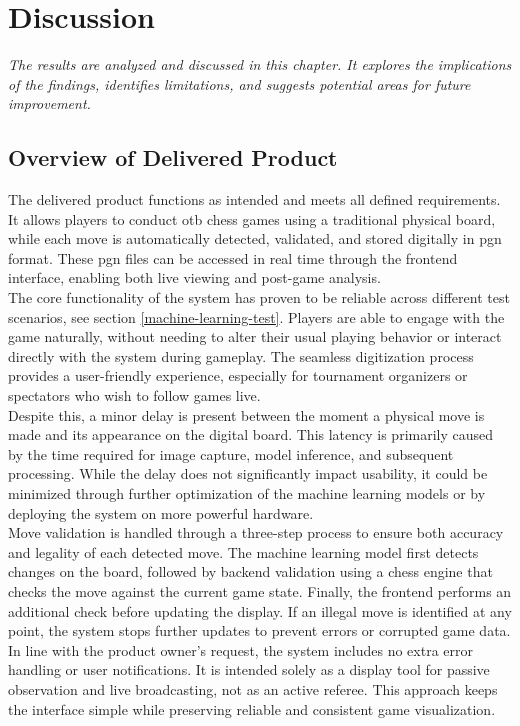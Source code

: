 \chapter{Discussion}

\begin{center}
    \textit{The results are analyzed and discussed in this chapter. It explores the implications of the findings, identifies limitations, and suggests potential areas for future improvement.}
\end{center}

\section{Overview of Delivered Product}
The delivered product functions as intended and meets all defined requirements. It allows players to conduct \gls{otb} chess games using a traditional physical board, while each move is automatically detected, validated, and stored digitally in \gls{pgn} format. These \gls{pgn} files can be accessed in real time through the frontend interface, enabling both live viewing and post-game analysis. \\

The core functionality of the system has proven to be reliable across different test scenarios, see section \ref{machine-learning-test}. Players are able to engage with the game naturally, without needing to alter their usual playing behavior or interact directly with the system during gameplay. The seamless digitization process provides a user-friendly experience, especially for tournament organizers or spectators who wish to follow games live. \\

Despite this, a minor delay is present between the moment a physical move is made and its appearance on the digital board. This latency is primarily caused by the time required for image capture, model inference, and subsequent processing. While the delay does not significantly impact usability, it could be minimized through further optimization of the machine learning models or by deploying the system on more powerful hardware. \\

Move validation is handled through a three-step process to ensure both accuracy and legality of each detected move. The machine learning model first detects changes on the board, followed by backend validation using a chess engine that checks the move against the current game state. Finally, the frontend performs an additional check before updating the display. If an illegal move is identified at any point, the system stops further updates to prevent errors or corrupted game data. In line with the product owner's request, the system includes no extra error handling or user notifications. It is intended solely as a display tool for passive observation and live broadcasting, not as an active referee. This approach keeps the interface simple while preserving reliable and consistent game visualization.

